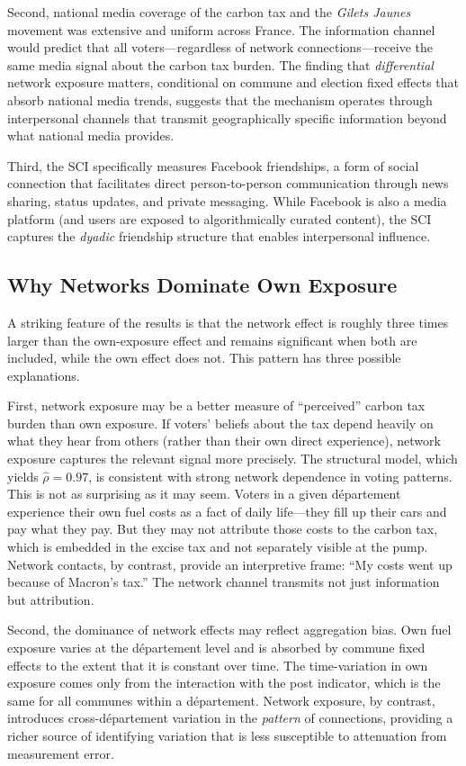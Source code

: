 \documentclass[12pt]{article}
\newcommand{\gj}{\textit{Gilets Jaunes}}
\newcommand{\dept}{d\'{e}partement}
\begin{document}
Second, national media coverage of the carbon tax and the \gj{} movement was extensive and uniform across France. The information channel would predict that all voters---regardless of network connections---receive the same media signal about the carbon tax burden. The finding that \textit{differential} network exposure matters, conditional on commune and election fixed effects that absorb national media trends, suggests that the mechanism operates through interpersonal channels that transmit geographically specific information beyond what national media provides.

Third, the SCI specifically measures Facebook friendships, a form of social connection that facilitates direct person-to-person communication through news sharing, status updates, and private messaging. While Facebook is also a media platform (and users are exposed to algorithmically curated content), the SCI captures the \textit{dyadic} friendship structure that enables interpersonal influence.

\subsection{Why Networks Dominate Own Exposure}

A striking feature of the results is that the network effect is roughly three times larger than the own-exposure effect and remains significant when both are included, while the own effect does not. This pattern has three possible explanations.

First, network exposure may be a better measure of ``perceived'' carbon tax burden than own exposure. If voters' beliefs about the tax depend heavily on what they hear from others (rather than their own direct experience), network exposure captures the relevant signal more precisely. The structural model, which yields $\hat{\rho} = 0.97$, is consistent with strong network dependence in voting patterns. This is not as surprising as it may seem. Voters in a given \dept{} experience their own fuel costs as a fact of daily life---they fill up their cars and pay what they pay. But they may not attribute those costs to the carbon tax, which is embedded in the excise tax and not separately visible at the pump. Network contacts, by contrast, provide an interpretive frame: ``My costs went up because of Macron's tax.'' The network channel transmits not just information but attribution.

Second, the dominance of network effects may reflect aggregation bias. Own fuel exposure varies at the \dept{} level and is absorbed by commune fixed effects to the extent that it is constant over time. The time-variation in own exposure comes only from the interaction with the post indicator, which is the same for all communes within a \dept{}. Network exposure, by contrast, introduces cross-\dept{} variation in the \textit{pattern} of connections, providing a richer source of identifying variation that is less susceptible to attenuation from measurement error.
\end{document}

